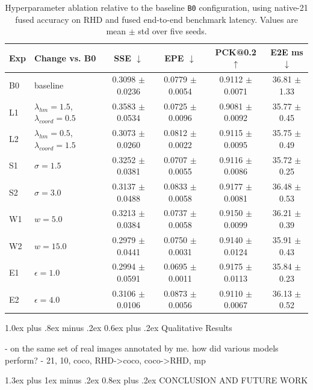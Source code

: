 \documentclass[10pt,letterpaper]{article}
\makeatletter
\renewcommand\section{\@startsection{section}{1}{\z@}%
  {1.3ex plus 1ex minus .2ex}%
  {0.8ex plus .2ex}%
  {\centering\normalfont\small\scshape}}
\renewcommand\subsection{\@startsection{subsection}{2}{\z@}%
  {1.0ex plus .8ex minus .2ex}%
  {0.6ex plus .2ex}%
  {\normalfont\itshape}}
\makeatother
\begin{document}
\begin{table}[H]
\centering
\footnotesize
\caption{Hyperparameter ablation relative to the baseline \texttt{B0} configuration, using native-21 fused accuracy on RHD and fused end-to-end benchmark latency. Values are mean $\pm$ std over five seeds.}
\label{tab:hyper_ablation}
\begin{tabular}{llcccc}
\toprule
Exp & Change vs. B0 & SSE $\downarrow$ & EPE $\downarrow$ & PCK@0.2 $\uparrow$ & E2E ms $\downarrow$ \\
\midrule
B0 & baseline & 0.3098 $\pm$ 0.0236 & 0.0779 $\pm$ 0.0054 & 0.9112 $\pm$ 0.0071 & 36.81 $\pm$ 1.33 \\
L1 & $\lambda_{hm}=1.5$, $\lambda_{coord}=0.5$ & 0.3583 $\pm$ 0.0534 & 0.0725 $\pm$ 0.0096 & 0.9081 $\pm$ 0.0092 & 35.77 $\pm$ 0.45 \\
L2 & $\lambda_{hm}=0.5$, $\lambda_{coord}=1.5$ & 0.3073 $\pm$ 0.0260 & 0.0812 $\pm$ 0.0022 & 0.9115 $\pm$ 0.0095 & 35.75 $\pm$ 0.49 \\
S1 & $\sigma=1.5$ & 0.3252 $\pm$ 0.0381 & 0.0707 $\pm$ 0.0055 & 0.9116 $\pm$ 0.0086 & 35.72 $\pm$ 0.25 \\
S2 & $\sigma=3.0$ & 0.3137 $\pm$ 0.0488 & 0.0833 $\pm$ 0.0058 & 0.9177 $\pm$ 0.0081 & 36.48 $\pm$ 0.53 \\
W1 & $w=5.0$ & 0.3213 $\pm$ 0.0384 & 0.0737 $\pm$ 0.0058 & 0.9150 $\pm$ 0.0099 & 36.21 $\pm$ 0.39 \\
W2 & $w=15.0$ & 0.2979 $\pm$ 0.0441 & 0.0750 $\pm$ 0.0031 & 0.9140 $\pm$ 0.0124 & 35.91 $\pm$ 0.43 \\
E1 & $\epsilon=1.0$ & 0.2994 $\pm$ 0.0591 & 0.0695 $\pm$ 0.0011 & 0.9175 $\pm$ 0.0113 & 35.84 $\pm$ 0.23 \\
E2 & $\epsilon=4.0$ & 0.3106 $\pm$ 0.0106 & 0.0873 $\pm$ 0.0056 & 0.9110 $\pm$ 0.0067 & 36.13 $\pm$ 0.52 \\
\bottomrule
\end{tabular}
\end{table}

\subsection{Qualitative Results}

- on the same set of real images annotated by me. how did various models perform?
- 21, 10, coco, RHD->coco, coco->RHD, mp

\section{CONCLUSION AND FUTURE WORK}
\end{document}
